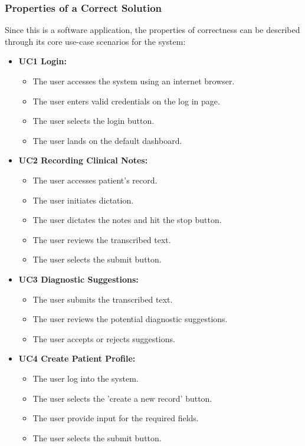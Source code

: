\documentclass[12pt]{article}
\begin{document}
\subsubsection{Properties of a Correct Solution} \label{sec_CorrectSolution}

Since this is a software application, the properties of correctness can be described through its core use-case scenarios for the system:

\begin{itemize}
  \item\textbf{UC1 Login:}
  \begin{itemize}
    \item The user accesses the system using an internet browser.
    \item The user enters valid credentials on the log in page.
    \item The user selects the login button.
    \item The user lands on the default dashboard.
  \end{itemize}
  \item\textbf{UC2 Recording Clinical Notes:}
  \begin{itemize}
    \item The user accesses patient's record.
    \item The user initiates dictation.
    \item The user dictates the notes and hit the stop button.
    \item The user reviews the transcribed text.
    \item The user selects the submit button.
  \end{itemize}
  \item\textbf{UC3 Diagnostic Suggestions:}
  \begin{itemize}
    \item The user submits the transcribed text.
    \item The user reviews the potential diagnostic suggestions.
    \item The user accepts or rejects suggestions.
  \end{itemize}
  \item\textbf{UC4 Create Patient Profile:}
  \begin{itemize}
    \item The user log into the system.
    \item The user selects the 'create a new record' button.
    \item The user provide input for the required fields.    
    \item The user selects the submit button.
  \end{itemize}
\end{itemize}
\end{document}
